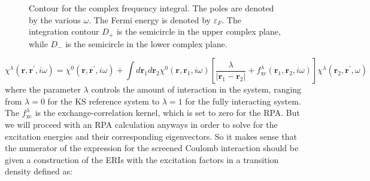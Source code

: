     \begin{figure}[h]
    \caption{Contour for the complex frequency integral. The poles are denoted by the various $\omega$. The Fermi energy is denoted by $\varepsilon_F$. The integration contour $D_+$ is the semicircle in the upper complex plane, while $D_-$ is the semicircle in the lower complex plane.}
    \label{fig:contour}
    \end{figure}
\begin{equation}\label{eq:dyson}
    \chi^{\lambda}\left(\mathbf{r}, \mathbf{r}^{\prime}, i \omega\right) = \chi^{0}\left(\mathbf{r}, \mathbf{r}^{\prime}, i \omega\right) 
    + \int d \mathbf{r}_{1} d \mathbf{r}_{2} \chi^{0}\left(\mathbf{r}, \mathbf{r}_{1}, i \omega\right)\left[\frac{\lambda}{\left|\mathbf{r}_{1}-\mathbf{r}_{2}\right|}+f_{\mathrm{xc}}^{\lambda}\left(\mathbf{r}_{1}, \mathbf{r}_{2}, i \omega\right)\right] \chi^{\lambda}\left(\mathbf{r}_{2}, \mathbf{r}^{\prime}, \omega\right)
\end{equation}
where the parameter $\lambda$ controls the amount of interaction in the system, ranging from $\lambda = 0$ for the KS reference system to $\lambda = 1$ for the fully interacting system. The $f_{\mathrm{xc}}^{\lambda}$ is the exchange-correlation kernel, which is set to zero for the RPA. But we will proceed with an RPA calculation anyways in order to solve for the excitation energies and their corresponding eigenvectors. So it makes sense that the numerator of the expression for the screened Coulomb interaction should be given a construction of the ERIs with the excitation factors in a transition density defined as:
